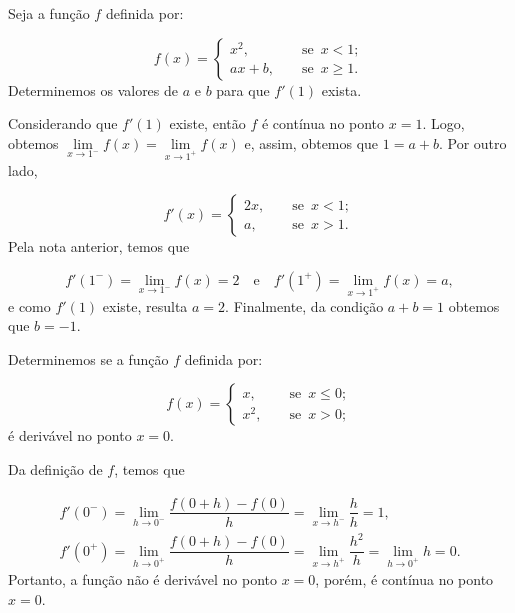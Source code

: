 \cleardoublepage\documentclass[../main.tex]{subfiles}
\begin{document}
\vspace{0.3cm}
\begin{ex}
  Seja a função \(f\) definida por:

\[ f(x)=\left\{ \begin{array}{ccl} x^2, & &\mbox{ se }\, x<1;\\ ax+b, & &\mbox{ se }\, x\geq 1. \end{array} \right. \]
Determinemos os valores de \(a\) e \(b\) para que \(f'(1)\) exista.

\begin{solut}
Considerando que \(f'(1)\) existe, então \(f\) é contínua no ponto \(x=1\). Logo, obtemos \(\lim\limits_{x\rightarrow 1^-}f(x)=\lim\limits_{x\rightarrow 1^+}f(x)\) e, assim, obtemos que \(1=a+b\).
Por outro lado,

\[ f'(x)=\left\{ \begin{array}{ccl} 2x, & &\mbox{ se }\, x<1;\\ a, & &\mbox{ se }\, x> 1. \end{array} \right. \]
Pela nota anterior, temos que

\[ f'(1^-)=\lim\limits_{x\rightarrow 1^-}f(x)=2 \quad \mbox{e}\quad f'(1^+)=\lim\limits_{x\rightarrow 1^+}f(x)=a, \]
e como \(f'(1)\) existe, resulta \(a=2\). Finalmente, da condição \(a+b=1\) obtemos que \(b=-1\).


\end{solut}
\end{ex}
\begin{ex}
  Determinemos se a função \(f\) definida por:

\[ f(x)=\left\{ \begin{array}{ccl} x, & &\mbox{ se }\, x\leq 0;\\ x^2, & &\mbox{ se }\, x> 0; \end{array} \right. \]
é derivável no ponto \(x=0\).

\begin{solut}
Da definição de \(f\), temos que

\[ \begin{array}{l} f'(0^-)= \lim\limits_{h\rightarrow 0^-}\dfrac{f(0+h)-f(0)}{h}=\lim\limits_{x\rightarrow h^-}\dfrac{h}{h}=1,\\ f'(0^+)= \lim\limits_{h\rightarrow 0^+}\dfrac{f(0+h)-f(0)}{h}=\lim\limits_{x\rightarrow h^+}\dfrac{h^2}{h}=\lim\limits_{h\rightarrow 0^+}h=0. \end{array} \]
Portanto, a função não é derivável no ponto \(x=0\), porém, é contínua no ponto \(x=0\).
\end{solut}
\end{ex}
\end{document}
